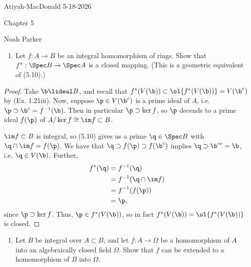 \documentclass[12pt]{amsart}
\begin{document}
{Atiyah-MacDonald} \hfill {5-18-2026}

\bigskip\bigskip

\begin{center}

{\sc Chapter 5}

\end{center}

\begin{center}

  {Noah Parker} 
    
\end{center}

\bigskip

\begin{enumerate}
	\item[5.1.] {
      Let $f:A\to B$ be an integral homomorphism of rings.
      Show that $f^*:\Spec B\to \Spec A$ is a closed mapping. (This is a geometric equivalent of (5.10).)
    }
\end{enumerate}

\begin{proof}
  Take $\b\lideal B$, and recall that $f^*(V(\b))\subset \ol {f^*(V(\b))}= V(\b^c)$ by (Ex. 1.21iii).
  Now, suppose $\p\in V(\b^c)$ is a prime ideal of $A$, i.e. $\p\supset \b^c=f^{-1}(\b)$.
  Then in particular $\p\supset \ker f$, so $\p$ decends to a prime ideal $f(\p)$ of $A/\ker f\cong \im f\subset B$.

  $\im f\subset B$ is integral, so (5.10) gives us a prime $\q\in \Spec B$ with $\q\cap \im f = f(\p)$.
  We have that $\q\supset f(\p) \supset f(\b^c)$ implies $\q\supset \b^{ce}=\b$, i.e. $\q\in V(\b)$.
  Further,
  \begin{align*}
    f^*(\q) &= f^{-1}(\q) \\
            &= f^{-1}(\q\cap \im f) \\
            &= f^{-1}(f(\p)) \\
            &= \p,
  \end{align*}
  since $\p\supset \ker f$.
  Thus, $\p\in f^*(V(\b))$, so in fact $f^*(V(\b))=\ol {f^*(V(\b))}$ is closed.
\end{proof}

\begin{enumerate}
	\item[5.2.] {
      Let $B$ be integral over $A\subset B$, and let $f:A\to \Omega$ be a homomorphism of $A$ into an algebraically closed field $\Omega$.
      Show that $f$ can be extended to a homomorphism of $B$ into $\Omega$.
    }
\end{enumerate}
\end{document}
